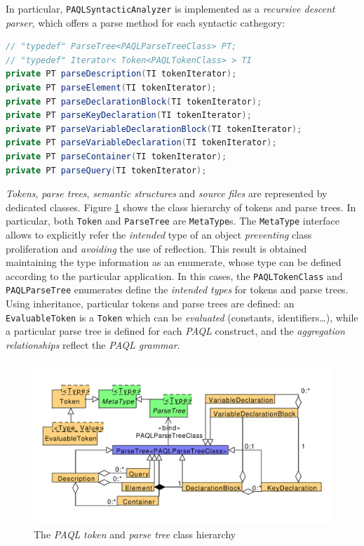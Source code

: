 \documentclass[10pt]{article}  %
\begin{document}
    In particular, \texttt{PAQLSyntacticAnalyzer} is implemented as a \emph{recursive descent parser}, which offers a parse method
    for each syntactic cathegory:
    \begin{lstlisting}[language=Java]
// "typedef" ParseTree<PAQLParseTreeClass> PT;
// "typedef" Iterator< Token<PAQLTokenClass> > TI
private PT parseDescription(TI tokenIterator);
private PT parseElement(TI tokenIterator);
private PT parseDeclarationBlock(TI tokenIterator);
private PT parseKeyDeclaration(TI tokenIterator);
private PT parseVariableDeclarationBlock(TI tokenIterator);
private PT parseVariableDeclaration(TI tokenIterator);
private PT parseContainer(TI tokenIterator);
private PT parseQuery(TI tokenIterator);
        \end{lstlisting}
    \emph{Tokens}, \emph{parse trees}, \emph{semantic structures} and \emph{source files} are represented by dedicated classes.
    Figure \ref{fig:tokenandparsetree} shows the class hierarchy of tokens and parse trees. In particular, both \texttt{Token}
    and \texttt{ParseTree} are \texttt{MetaType}s. The \texttt{MetaType} interface allows to explicitly refer the \emph{intended}
    type of an object \emph{preventing} class proliferation and \emph{avoiding} the use of reflection. This result is obtained
    maintaining the type information as an enumerate, whose type can be defined according to the particular application. In this
    cases, the \texttt{PAQLTokenClass} and \texttt{PAQLParseTree} enumerates define the \emph{intended types} for tokens and parse trees.
    Using inheritance, particular tokens and parse trees are defined: an \texttt{EvaluableToken} is a \texttt{Token} which can be
    \emph{evaluated} (constants, identifiers\ldots), while a particular parse tree is defined for each \emph{PAQL} construct,
    and the \emph{aggregation relationships} reflect the \emph{PAQL grammar}.
    \begin{figure}[htbp]
        \centering
        \includegraphics[scale=0.45]{classDIagram.pdf}
        \caption{The \emph{PAQL} \emph{token} and \emph{parse tree} class hierarchy }\label{fig:tokenandparsetree}
    \end{figure}
\end{document}
